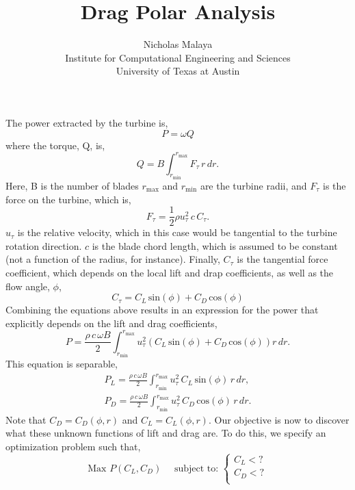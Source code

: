 \documentclass{article}
\title{\bf{Drag Polar Analysis}}
\author{Nicholas Malaya \\ Institute for Computational Engineering and Sciences \\ University of Texas at Austin} \date{}
\begin{document}
\maketitle

\newpage

The power extracted by the turbine is, 
\begin{equation}
 P = \omega Q
\end{equation}
where the torque, Q, is, 
\begin{equation}
 Q = B \int_{r_{\text{min}}}^{r_{\text{max}}} F_{\tau}\, r\, dr.
\end{equation}
Here, B is the number of blades $r_{\text{max}}$ and $r_{\text{min}}$
are the turbine radii, and $F_{\tau}$ is the force on the turbine, which
is, 
\begin{equation}
 F_{\tau} = \frac{1}{2}\rho u_{\tau}^2 \, c \, C_{\tau}.
\end{equation}
$u_\tau$ is the relative velocity, which in this case would be
tangential to the turbine rotation direction. $c$ is the blade chord
length, which is assumed to be constant (not a function of the radius,
for instance). Finally, $C_{\tau}$ is the tangential force coefficient,
which depends on the local lift and drap coefficients, as well as the
flow angle, $\phi$, 
\begin{equation}
 C_{\tau} = C_L \,\text{sin}(\phi) + C_D \,\text{cos}(\phi)
\end{equation}
Combining the equations above results in an expression for the power
that explicitly depends on the lift and drag coefficients, 
\begin{equation*}
 P = \frac{\rho\, c\, \omega B}{2}
  \int_{r_{\text{min}}}^{r_{\text{max}}} u_{\tau}^2 \left(C_L
						     \,\text{sin}(\phi)
						     + C_D
						     \,\text{cos}(\phi)
						    \right) r\,dr. 
\end{equation*}
This equation is separable, 
\begin{align*}
 P_L = \frac{\rho\, c\, \omega B}{2}
  \int_{r_{\text{min}}}^{r_{\text{max}}} u_{\tau}^2 \, C_L \,\text{sin}(\phi)\, r\,dr, \\
 P_D = \frac{\rho\, c\, \omega B}{2}
  \int_{r_{\text{min}}}^{r_{\text{max}}} u_{\tau}^2 \, C_D \,\text{cos}(\phi)\, r\,dr. 
\end{align*}
Note that $C_D = C_D(\phi,r)$ and $C_L = C_L(\phi,r)$. Our objective is
now to discover what these unknown functions of lift and drag are. To do
this, we specify an optimization problem such that, 
\begin{equation*} 
 \text{Max } P(C_L,C_D) \quad \text{ subject to: }
  \begin{cases}
    C_L < ?\\
    C_D < ? \\
  \end{cases}
\end{equation*}
\end{document}
